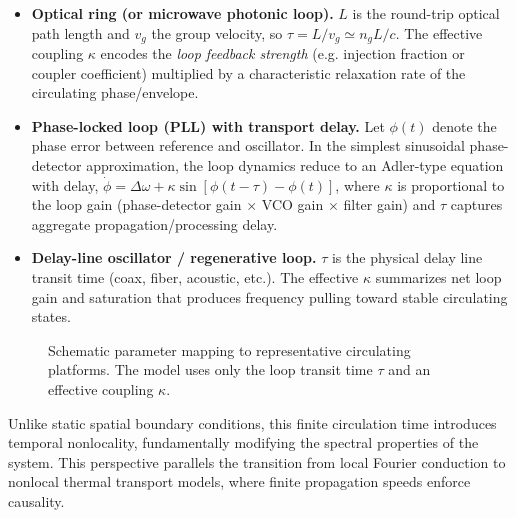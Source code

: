 \documentclass[11pt,a4paper]{article}
\begin{document}
\begin{itemize}
\item \textbf{Optical ring (or microwave photonic loop).} $L$ is the round-trip optical path length and $v_g$ the group velocity, so $\tau = L/v_g \simeq n_g L/c$. The effective coupling $\kappa$ encodes the \emph{loop feedback strength} (e.g. injection fraction or coupler coefficient) multiplied by a characteristic relaxation rate of the circulating phase/envelope.
\item \textbf{Phase-locked loop (PLL) with transport delay.} Let $\phi(t)$ denote the phase error between reference and oscillator. In the simplest sinusoidal phase-detector approximation, the loop dynamics reduce to an Adler-type equation with delay, $\dot{\phi}=\Delta\omega+\kappa\sin[\phi(t-\tau)-\phi(t)]$, where $\kappa$ is proportional to the loop gain (phase-detector gain $\times$ VCO gain $\times$ filter gain) and $\tau$ captures aggregate propagation/processing delay.
\item \textbf{Delay-line oscillator / regenerative loop.} $\tau$ is the physical delay line transit time (coax, fiber, acoustic, etc.). The effective $\kappa$ summarizes net loop gain and saturation that produces frequency pulling toward stable circulating states.
\end{itemize}

\begin{figure}[h]
\centering
{}
\caption{Schematic parameter mapping to representative circulating platforms. The model uses only the loop transit time $\tau$ and an effective coupling $\kappa$.}
\label{fig:platform_mapping}
\end{figure}


Unlike static spatial boundary conditions, this finite circulation time introduces temporal nonlocality, fundamentally modifying the spectral properties of the system. This perspective parallels the transition from local Fourier conduction to nonlocal thermal transport models, where finite propagation speeds enforce causality.
\end{document}
